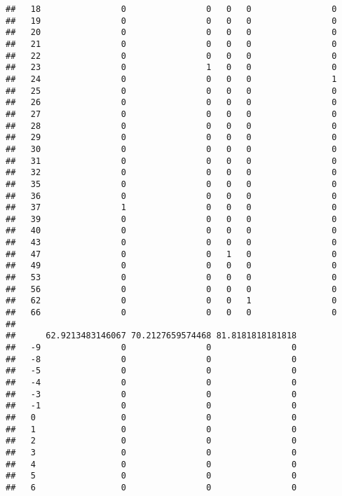 \documentclass[]{article}
\begin{document}
\begin{verbatim}
##   18                0                0   0   0                0
##   19                0                0   0   0                0
##   20                0                0   0   0                0
##   21                0                0   0   0                0
##   22                0                0   0   0                0
##   23                0                1   0   0                0
##   24                0                0   0   0                1
##   25                0                0   0   0                0
##   26                0                0   0   0                0
##   27                0                0   0   0                0
##   28                0                0   0   0                0
##   29                0                0   0   0                0
##   30                0                0   0   0                0
##   31                0                0   0   0                0
##   32                0                0   0   0                0
##   35                0                0   0   0                0
##   36                0                0   0   0                0
##   37                1                0   0   0                0
##   39                0                0   0   0                0
##   40                0                0   0   0                0
##   43                0                0   0   0                0
##   47                0                0   1   0                0
##   49                0                0   0   0                0
##   53                0                0   0   0                0
##   56                0                0   0   0                0
##   62                0                0   0   1                0
##   66                0                0   0   0                0
##     
##      62.9213483146067 70.2127659574468 81.8181818181818
##   -9                0                0                0
##   -8                0                0                0
##   -5                0                0                0
##   -4                0                0                0
##   -3                0                0                0
##   -1                0                0                0
##   0                 0                0                0
##   1                 0                0                0
##   2                 0                0                0
##   3                 0                0                0
##   4                 0                0                0
##   5                 0                0                0
##   6                 0                0                0

\end{verbatim}
\end{document}
